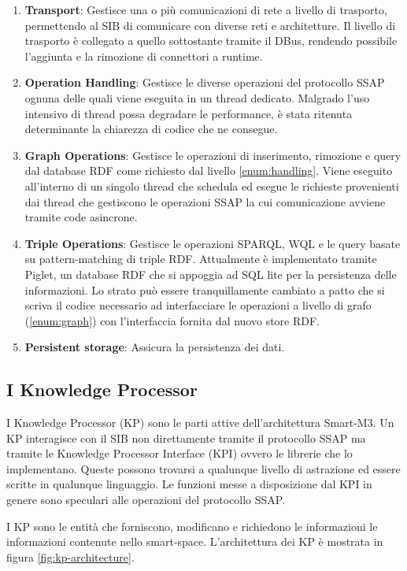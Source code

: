 \begin{enumerate}
	\item \textbf{Transport}: Gestisce una o più comunicazioni di rete a livello di trasporto, permettendo al SIB di comunicare con diverse reti e architetture. Il livello di trasporto è collegato a quello sottostante tramite il DBus, rendendo possibile l'aggiunta e la rimozione di connettori a runtime.
	\item \label{enum:handling}\textbf{Operation Handling}: Gestisce le diverse operazioni del protocollo SSAP ognuna delle quali viene eseguita in un thread dedicato. Malgrado l'uso intensivo di thread possa degradare le performance,  è stata ritenuta determinante la chiarezza di codice che ne consegue.
	\item \label{enum:graph}\textbf{Graph Operations}: Gestisce le operazioni di inserimento, rimozione e query dal database RDF come richiesto dal livello \ref{enum:handling}. Viene eseguito all'interno di un singolo thread che schedula ed esegue le richieste provenienti dai thread che gestiscono le operazioni SSAP la cui comunicazione avviene tramite code asincrone.
	\item \textbf{Triple Operations}: Gestisce le operazioni SPARQL, WQL e le query basate su pattern-matching di triple RDF. Attualmente è implementato tramite Piglet, un database RDF che si appoggia ad SQL lite per la persistenza delle informazioni. Lo strato può essere tranquillamente cambiato a patto che si scriva il codice necessario ad interfacciare le operazioni a livello di grafo (\ref{enum:graph}) con l'interfaccia fornita dal nuovo store RDF.
	\item \textbf{Persistent storage}: Assicura la persistenza dei dati.
\end{enumerate}

\subsection{I Knowledge Processor}\label{subsec:kp}

I Knowledge Processor (KP) sono le parti attive dell'architettura Smart-M3. Un KP interagisce con il SIB non direttamente tramite il protocollo SSAP ma tramite le Knowledge Processor Interface (KPI) ovvero le librerie che lo implementano. Queste possono trovarsi a qualunque livello di astrazione ed essere scritte in qualunque linguaggio. Le funzioni messe a disposizione dal KPI in genere sono speculari alle operazioni del protocollo SSAP.

I KP sono le entità che forniscono, modificano e richiedono le informazioni le informazioni contenute nello smart-space. L'architettura dei KP è mostrata in figura \ref{fig:kp-architecture}.

